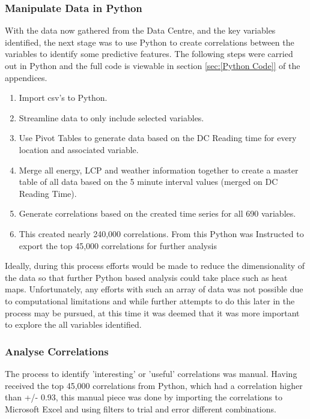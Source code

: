 \documentclass[12pt]{scrartcl}
\begin{document}
\subsubsection{Manipulate Data in Python}
\label{subsubsec:[Manipulate Data in Python]}

With the data now gathered from the Data Centre, and the key variables identified, the next stage was to use Python to create correlations between the variables to identify some predictive features. The following steps were carried out in Python and the full code is viewable in section \ref{sec:[Python Code]} of the appendices.

\begin{enumerate}
\item Import csv's to Python.
\item Streamline data to only include selected variables. 
\item Use Pivot Tables to generate data based on the DC Reading time for every location and associated variable. 
\item Merge all energy, \gls{LCP} and weather information together to create a master table of all data based on the 5 minute interval values (merged on DC Reading Time).
\item Generate correlations based on the created time series for all 690 variables.
\item This created nearly 240,000 correlations. From this Python was Instructed to export the top 45,000 correlations for further analysis
\end{enumerate} 

Ideally, during this process efforts would be made to reduce the dimensionality of the data so that further Python based analysis could take place such as heat maps. Unfortunately, any efforts with such an array of data was not possible due to computational limitations and while further attempts to do this later in the process may be pursued, at this time it was deemed that it was more important to explore the all variables identified.

\subsubsection{Analyse Correlations}
\label{subsubsec:[Analyse Correlations]}

The process to identify 'interesting' or 'useful' correlations was manual. Having received the top 45,000 correlations from Python, which had a correlation higher than +/- 0.93, this manual piece was done by importing the correlations to Microsoft Excel and using filters to trial and error different combinations. 
\end{document}
